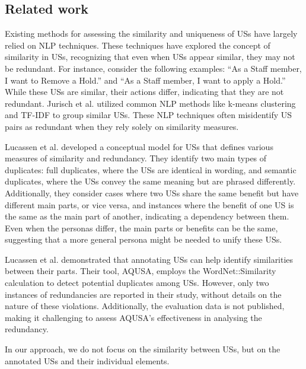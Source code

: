 \subsection{Related work}\label{redundancy_related_work}
Existing methods for assessing the similarity and uniqueness of USs have largely relied on NLP techniques. These techniques have explored the concept of similarity in USs, recognizing that even when USs appear similar, they may not be redundant. For instance, consider the following examples: “As a Staff member, I want to Remove a Hold.” and “As a Staff member, I want to apply a Hold.” While these USs are similar, their actions differ, indicating that they are not redundant. Jurisch et al. utilized common NLP methods like k-means clustering and TF-IDF to group similar USs\cite{ duszkiewicz2022identifying}. These NLP techniques often misidentify US pairs as redundant when they rely solely on similarity measures\cite{duszkiewicz2022identifying,jurischsimilarity,levin1993english}.

Lucassen et al. developed a conceptual model for USs that defines various measures of similarity and redundancy. They identify two main types of duplicates: full duplicates, where the USs are identical in wording, and semantic duplicates, where the USs convey the same meaning but are phrased differently. Additionally, they consider cases where two USs share the same benefit but have different main parts, or vice versa, and instances where the benefit of one US is the same as the main part of another, indicating a dependency between them. Even when the personas differ, the main parts or benefits can be the same, suggesting that a more general persona might be needed to unify these USs\cite{Lucassen2015}.

Lucassen et al. demonstrated that annotating USs can help identify similarities between their parts. Their tool, AQUSA, employs the WordNet::Similarity calculation to detect potential duplicates among USs. However, only two instances of redundancies are reported in their study, without details on the nature of these violations. Additionally, the evaluation data is not published, making it challenging to assess AQUSA's effectiveness in analysing the redundancy.

In our approach, we do not focus on the similarity between USs, but on the annotated USs and their individual elements. 
